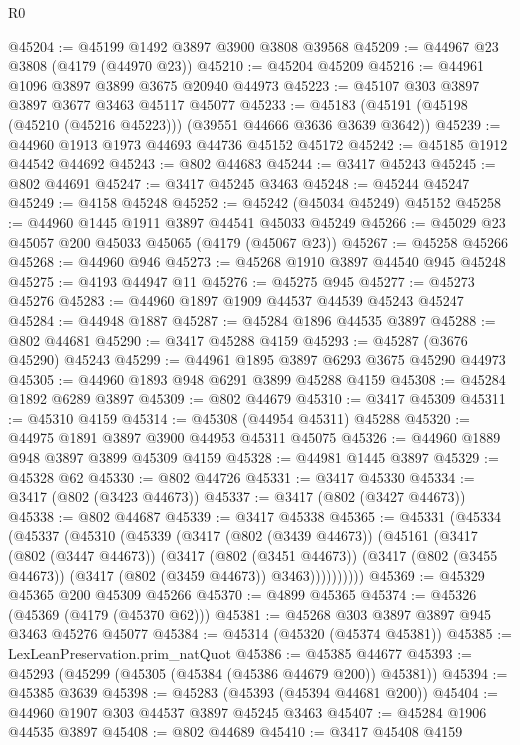 \begin{lexlean}{R0}
\begin{coremodule}
@45204 := @45199 @1492 @3897 @3900 @3808 @39568
@45209 := @44967 @23 @3808 (@4179 (@44970 @23))
@45210 := @45204 @45209
@45216 := @44961 @1096 @3897 @3899 @3675 @20940 @44973
@45223 := @45107 @303 @3897 @3897 @3677 @3463 @45117 @45077
@45233 := @45183 (@45191 (@45198 (@45210 (@45216 @45223))) (@39551 @44666 @3636 @3639 @3642))
@45239 := @44960 @1913 @1973 @44693 @44736 @45152 @45172
@45242 := @45185 @1912 @44542 @44692
@45243 := @802 @44683
@45244 := @3417 @45243
@45245 := @802 @44691
@45247 := @3417 @45245 @3463
@45248 := @45244 @45247
@45249 := @4158 @45248
@45252 := @45242 (@45034 @45249) @45152
@45258 := @44960 @1445 @1911 @3897 @44541 @45033 @45249
@45266 := @45029 @23 @45057 @200 @45033 @45065 (@4179 (@45067 @23))
@45267 := @45258 @45266
@45268 := @44960 @946
@45273 := @45268 @1910 @3897 @44540 @945 @45248
@45275 := @4193 @44947 @11
@45276 := @45275 @945
@45277 := @45273 @45276
@45283 := @44960 @1897 @1909 @44537 @44539 @45243 @45247
@45284 := @44948 @1887
@45287 := @45284 @1896 @44535 @3897
@45288 := @802 @44681
@45290 := @3417 @45288 @4159
@45293 := @45287 (@3676 @45290) @45243
@45299 := @44961 @1895 @3897 @6293 @3675 @45290 @44973
@45305 := @44960 @1893 @948 @6291 @3899 @45288 @4159
@45308 := @45284 @1892 @6289 @3897
@45309 := @802 @44679
@45310 := @3417 @45309
@45311 := @45310 @4159
@45314 := @45308 (@44954 @45311) @45288
@45320 := @44975 @1891 @3897 @3900 @44953 @45311 @45075
@45326 := @44960 @1889 @948 @3897 @3899 @45309 @4159
@45328 := @44981 @1445 @3897
@45329 := @45328 @62
@45330 := @802 @44726
@45331 := @3417 @45330
@45334 := @3417 (@802 (@3423 @44673))
@45337 := @3417 (@802 (@3427 @44673))
@45338 := @802 @44687
@45339 := @3417 @45338
@45365 := @45331
    (@45334
      (@45337
        (@45310
          (@45339
            (@3417
              (@802 (@3439 @44673))
              (@45161
                (@3417
                  (@802 (@3447 @44673))
                  (@3417
                    (@802 (@3451 @44673))
                    (@3417 (@802 (@3455 @44673)) (@3417 (@802 (@3459 @44673)) @3463))))))))))
@45369 := @45329 @45365 @200 @45309 @45266
@45370 := @4899 @45365
@45374 := @45326 (@45369 (@4179 (@45370 @62)))
@45381 := @45268 @303 @3897 @3897 @945 @3463 @45276 @45077
@45384 := @45314 (@45320 (@45374 @45381))
@45385 := LexLeanPreservation.prim_natQuot
@45386 := @45385 @44677
@45393 := @45293 (@45299 (@45305 (@45384 (@45386 @44679 @200)) @45381))
@45394 := @45385 @3639
@45398 := @45283 (@45393 (@45394 @44681 @200))
@45404 := @44960 @1907 @303 @44537 @3897 @45245 @3463
@45407 := @45284 @1906 @44535 @3897
@45408 := @802 @44689
@45410 := @3417 @45408 @4159

\end{coremodule}
\end{lexlean}
